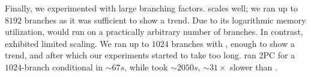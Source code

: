 Finally, we experimented with large branching factors.
\ourschemelong scales well; we ran up to $8192$ branches as it
was sufficient to show a trend.  Due to its logarithmic memory
utilization, \ourschemelong would run on a practically
arbitrary number of branches.  In contrast, \stack exhibited limited
scaling.  We ran up to $1024$ branches with
\stack, enough to show a trend, and after which our experiments
started to take too long.   \ourschemelong ran 2PC for a
$1024$-branch conditional in $\sim 67s$, while \stack took $\sim
2050s$,  $\sim 31\times$ slower than \ourschemelong.

\vspace{-12pt}

